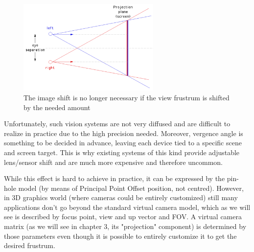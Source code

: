 \begin{figure}
\centering
\includegraphics[width=7cm]{schemas/offaxis}
\caption{The image shift is no longer necessary if the view frustrum is shifted by the needed amount}
\label{fig:offaxis_cameras}
\end{figure}

Unfortunately, such vision systems are not very diffused and are difficult to realize in practice due to the high precision needed. Moreover, vergence angle is something to be decided in advance, leaving each device tied to a specific scene and screen target. This is why existing systems of this kind provide adjustable lens/sensor shift and are much more expensive and therefore uncommon.

While this effect is hard to achieve in practice, it can be expressed by the pin-hole model (by means of Principal Point Offset position, not centred). However, in 3D graphics world (where cameras could be entirely customized) still many applications don't go beyond the standard virtual camera model, which as we will see is described by focus point, view and up vector and FOV. A virtual camera matrix (as we will see in chapter 3, its "projection" component) is determined by those parameters even though it is possible to entirely customize it to get the desired frustrum.

